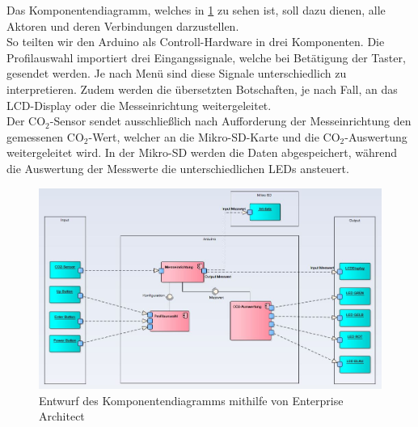 \label{Komponenten}

Das Komponentendiagramm, welches in \ref{fig:KomponentenDiagramm} zu sehen ist, soll dazu dienen, alle Aktoren und deren Verbindungen darzustellen. \\
So teilten wir den Arduino als Controll-Hardware in drei Komponenten. Die Profilauswahl importiert drei Eingangssignale, welche bei Betätigung der Taster, gesendet werden. Je nach Menü sind diese Signale unterschiedlich zu interpretieren. Zudem werden die übersetzten Botschaften, je nach Fall, an das \ac{LCD}-Display oder die Messeinrichtung weitergeleitet. \\
Der CO$_2$-Sensor sendet ausschließlich nach Aufforderung der Messeinrichtung den gemessenen CO$_2$-Wert, welcher an die Mikro-SD-Karte und die CO$_2$-Auswertung weitergeleitet wird. In der Mikro-SD werden die Daten abgespeichert, während die Auswertung der Messwerte die unterschiedlichen \ac{LED}s ansteuert.

\begin{figure}[!hbt]
	\centering
	\includegraphics[width=0.9\linewidth]{Images/Komponentendiagramm}
	\caption{Entwurf des Komponentendiagramms mithilfe von Enterprise Architect}
	\label{fig:KomponentenDiagramm}
\end{figure}